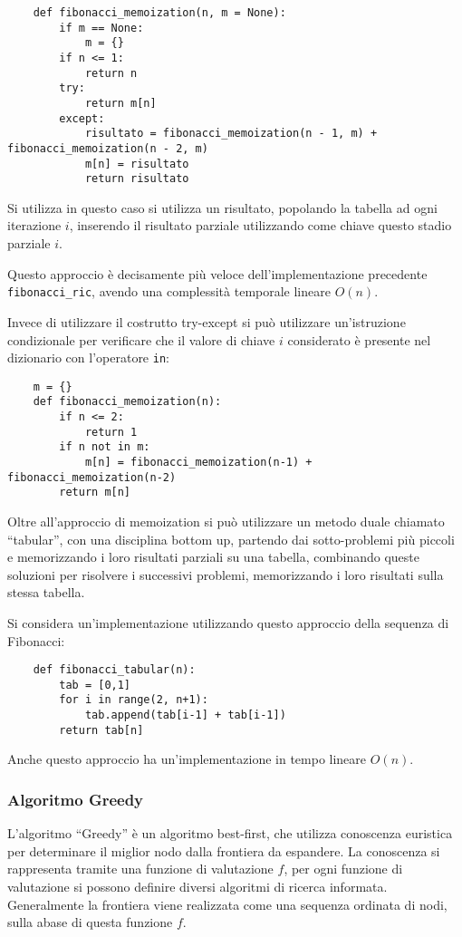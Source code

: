 \documentclass{article}
\numberwithin{equation}{subsection}
\begin{document}
\begin{verbatim}
    def fibonacci_memoization(n, m = None):
        if m == None:
            m = {}
        if n <= 1:
            return n
        try: 
            return m[n]
        except:
            risultato = fibonacci_memoization(n - 1, m) + fibonacci_memoization(n - 2, m)
            m[n] = risultato
            return risultato
\end{verbatim}

Si utilizza in questo caso si utilizza un risultato, popolando la tabella ad ogni iterazione $i$, 
inserendo il risultato parziale utilizzando come chiave questo stadio parziale $i$. 

Questo approccio è decisamente più veloce dell'implementazione precedente \verb|fibonacci_ric|, 
avendo una complessità temporale lineare $O(n)$. 

Invece di utilizzare il costrutto try-except si può utilizzare un'istruzione condizionale 
per verificare che il valore di chiave $i$ considerato è presente nel dizionario con 
l'operatore \verb|in|:
\begin{verbatim}
    m = {}
    def fibonacci_memoization(n):
        if n <= 2:
            return 1
        if n not in m:
            m[n] = fibonacci_memoization(n-1) + fibonacci_memoization(n-2)
        return m[n]
\end{verbatim}

Oltre all'approccio di memoization si può utilizzare un metodo duale chiamato ``tabular'', 
con una disciplina bottom up, partendo dai sotto-problemi più piccoli e memorizzando i loro 
risultati parziali su una tabella, combinando queste soluzioni per risolvere i successivi 
problemi, memorizzando i loro risultati sulla stessa tabella. 

Si considera un'implementazione utilizzando questo approccio della sequenza di Fibonacci:
\begin{verbatim}
    def fibonacci_tabular(n):
        tab = [0,1]
        for i in range(2, n+1):
            tab.append(tab[i-1] + tab[i-1])
        return tab[n]
\end{verbatim}

Anche questo approccio ha un'implementazione in tempo lineare $O(n)$. 

\subsubsection{Algoritmo Greedy}

L'algoritmo ``Greedy'' è un algoritmo best-first, che utilizza conoscenza euristica per 
determinare il miglior nodo dalla frontiera da espandere. La conoscenza si rappresenta tramite 
una funzione di valutazione $f$, per ogni funzione di valutazione si possono definire diversi 
algoritmi di ricerca informata. Generalmente la frontiera viene realizzata come una sequenza 
ordinata di nodi, sulla abase di questa funzione $f$. 
\end{document}
